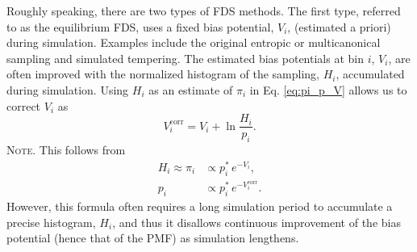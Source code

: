\documentclass[reprint, superscriptaddress, floatfix]{revtex4-1}
\newcommand{\note}[1]{{\color{DarkGreen}\footnotesize \textsc{Note.} #1}}
\begin{document}
Roughly speaking, there are two types of FDS methods.
%
The first type,
referred to as the equilibrium FDS, %
uses a fixed bias potential, $V_i$,
(estimated a priori)
during simulation.
%
Examples include the original
entropic or multicanonical sampling\cite{
berg1992, *lee1993}
and simulated tempering\cite{
marinari1992, *lyubartsev1992}.
%
The estimated bias potentials at bin $i$, $V_i$,
are often improved
with the normalized histogram of the sampling, $H_i$, accumulated
during simulation.
%
Using $H_i$ as an estimate of $\pi_i$ in
Eq. \eqref{eq:pi_p_V}
allows us to correct $V_i$ as
%
\begin{equation}
  V^\mathrm{corr}_i
  =
  V_i
  +
  \ln \frac{ H_i }
           { p_i }.
  \label{eq:vcorr_equil}
\end{equation}
%
\note{This follows from
  $$
  \begin{aligned}
    H_i \approx \pi_i
    &\propto p^*_i \, e^{-V_i},
    \\
    p_i
    &\propto p^*_i \, e^{-V^\mathrm{corr}_i}.
  \end{aligned}
  $$
}
However, this formula often requires a long
simulation period to accumulate a precise histogram, $H_i$,
and thus it disallows
continuous improvement of the bias potential
(hence that of the PMF)
as simulation lengthens.
\end{document}
